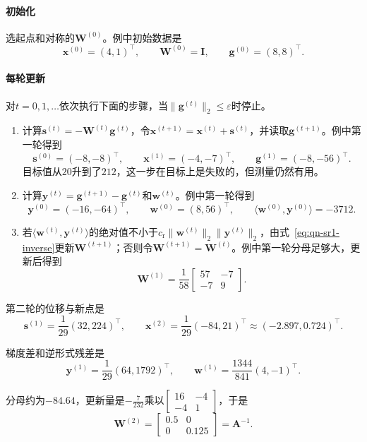 \paragraph{初始化}
选起点和对称的$\bm{W}^{(0)}$。例中初始数据是
\[
 \bm{x}^{(0)}=(4,1)^\top,\qquad\bm{W}^{(0)}=\bm{I},\qquad\bm{g}^{(0)}=(8,8)^\top.
\]

\paragraph{每轮更新}
对$t=0,1,\ldots$依次执行下面的步骤，当$\lVert\bm{g}^{(t)}\rVert_2\leq\varepsilon$时停止。

\begin{enumerate}
\item 计算$\bm{s}^{(t)}=-\bm{W}^{(t)}\bm{g}^{(t)}$，令$\bm{x}^{(t+1)}=\bm{x}^{(t)}+\bm{s}^{(t)}$，并读取$\bm{g}^{(t+1)}$。例中第一轮得到
\[
 \bm{s}^{(0)}=(-8,-8)^\top,\qquad\bm{x}^{(1)}=(-4,-7)^\top,\qquad\bm{g}^{(1)}=(-8,-56)^\top.
\]
目标值从$20$升到了$212$，这一步在目标上是失败的，但测量仍然有用。

\item 计算$\bm{y}^{(t)}=\bm{g}^{(t+1)}-\bm{g}^{(t)}$和$\bm{w}^{(t)}$。例中第一轮得到
\[
 \bm{y}^{(0)}=(-16,-64)^\top,\qquad\bm{w}^{(0)}=(8,56)^\top,\qquad\langle\bm{w}^{(0)},\bm{y}^{(0)}\rangle=-3712.
\]

\item 若$\langle\bm{w}^{(t)},\bm{y}^{(t)}\rangle$的绝对值不小于$c_{\mathrm{r}}\lVert\bm{w}^{(t)}\rVert_2\lVert\bm{y}^{(t)}\rVert_2$，由式~\eqref{eq:qn-sr1-inverse}更新$\bm{W}^{(t+1)}$；否则令$\bm{W}^{(t+1)}=\bm{W}^{(t)}$。例中第一轮分母足够大，更新后得到
\[
 \bm{W}^{(1)}=\frac{1}{58}\begin{bmatrix}57&-7\\-7&9\end{bmatrix}.
\]
\end{enumerate}

第二轮的位移与新点是
\[
 \bm{s}^{(1)}=\frac{1}{29}(32,224)^\top,\qquad\bm{x}^{(2)}=\frac{1}{29}(-84,21)^\top\approx(-2.897,0.724)^\top.
\]

梯度差和逆形式残差是
\[
 \bm{y}^{(1)}=\frac{1}{29}(64,1792)^\top,\qquad\bm{w}^{(1)}=\frac{1344}{841}(4,-1)^\top.
\]

分母约为$-84.64$，更新量是$-\tfrac{7}{232}$乘以$\begin{bmatrix}16&-4\\-4&1\end{bmatrix}$，于是
\[
 \bm{W}^{(2)}=\begin{bmatrix}0.5&0\\0&0.125\end{bmatrix}=\bm{A}^{-1}.
\]

